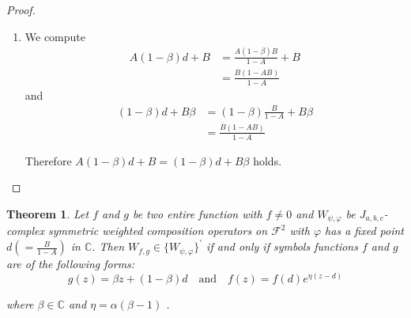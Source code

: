 \documentclass[10pt,a4paper]{amsart}
\newtheorem{Theorem}{Theorem}
\numberwithin{equation}{section}
\begin{document}
\begin{proof}
\begin{enumerate}
    \item  We compute
        \begin{align*}
        A(1-\beta)d+B &= \frac{A(1-\beta)B}{1-A}+B\\
        &= \frac{B(1-AB)}{1-A}
    \end{align*}
    and 
       \begin{align*}
        (1-\beta)d+B\beta &= (1-\beta)\frac{B}{1-A}+ B\beta\\
        &= \frac{B(1-AB)}{1-A}
    \end{align*} 
    
Therefore $ A(1-\beta)d+B= (1-\beta)d+B\beta$ holds.
\end{enumerate}
\end{proof}


\begin{Theorem}\label{t3}
Let $f$ and $g$ be two entire function with $f\neq 0$ and $W_{\psi, \varphi}$ be $J_{a,b,c}$-complex symmetric weighted  composition operators on $\mathcal{F}^{2}$ with $\varphi$ has a fixed point 
$d(=\frac{B}{1-A})$ in $\mathbb{C}$. Then $W_{f,g} \in \{W_{\psi, \varphi}\}^{'}$ if and only if symbols functions $f$ and $g$ are of the following forms:
\begin{equation}\label{e1}
  g(z)= \beta z+ (1-\beta) d \text{~~ and ~~} f(z)= f(d) e^{\eta(z-d)}  
\end{equation}

where  $\beta \in \mathbb{C}$ and $ \eta = \alpha (\beta -1)$ .
\end{Theorem}
\end{document}
